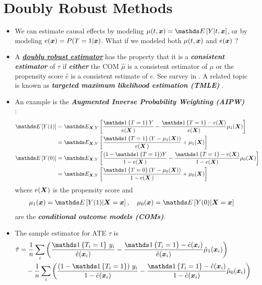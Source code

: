 \documentclass[11pt]{article}
\begin{document}
\section{Doubly Robust Methods}
\begin{itemize}
\item We can estimate causal effects by modeling $\mu(t, \mb{x}) = \E{}{Y |t, \mb{x}}$, or by modeling $e(\boldsymbol{x})  = P(T=1|\boldsymbol{x})$. What if we modeled both $\mu(t, \boldsymbol{x})$ and $e(\boldsymbol{x})$ ? 

\item A \underline{\emph{\textbf{doubly robust estimator}}} has the property that it is a \emph{\textbf{consistent estimator}} of $\tau$ if \emph{\textbf{either}} the COM $\hat{\mu}$ is a consistent estimator of $\mu$ or the propensity score $\hat{e}$ is a consistent estimate of $e$. See survey in \citep{seaman2018introduction}. A related topic is known as \emph{\textbf{targeted maximum likelihood estimation (TMLE)}} \citep{van2006targeted, van2011targeted, schuler2017targeted}.

\item An example is the \emph{\textbf{Augmented Inverse Probability Weighting (AIPW)}} \citep{kurz2022augmented}:
\begin{align}
\E{}{Y(1)} &= \E{\mb{X}, Y}{\frac{\ind{T=1}Y}{e(\mb{X}\,)} - \frac{\ind{T=1} - e(\mb{X})}{e(\mb{X})} \mu_1(\mb{X})}  \label{eqn: aipw_11} \\
&= \E{\mb{X}, Y}{\frac{\ind{T=1}(Y- \mu_1(\mb{X}))}{e(\mb{X}\,)} +  \mu_1(\mb{X})} \label{eqn: aipw_12} \\
\E{}{Y(0)} &= \E{\mb{X}, Y}{\frac{(1-\ind{T=1})Y}{1- e(\mb{X}\,)} - \frac{\ind{T=1} - e(\mb{X})}{1 - e(\mb{X})} \mu_0(\mb{X})}  \label{eqn: aipw_01} \\
&= \E{\mb{X}, Y}{\frac{\ind{T=0}(Y- \mu_0(\mb{X}))}{1 - e(\mb{X}\,)} +  \mu_0(\mb{X})} \label{eqn: aipw_02}
\end{align} where $e(\boldsymbol{X})$ is the propensity score and 
\begin{align*}
 \mu_1(\mb{x}) = \E{}{Y(1) | \mb{X} = \mb{x}}, \quad  \mu_0(\mb{x}) = \E{}{Y(0) | \mb{X} = \mb{x}}
\end{align*} are the \emph{\textbf{conditional outcome models (COMs)}}.

\item 
The sample estimator for ATE $\tau$ is
\begin{align}
\hat{\tau} &= \frac{1}{n}\sum_{i}\paren{\frac{\ind{T_i=1}\,y_i}{\hat{e}(\mb{x}_i)} -  \frac{\ind{T_i=1} - \hat{e}(\mb{x}_i)}{\hat{e}(\mb{x}_i)}\hat{\mu}_1(\mb{x}_i)} \nonumber\\
&\quad -   \frac{1}{n}\sum_{i}\paren{\frac{\paren{1-\ind{T_i=1}}\,y_i}{1-\hat{e}(\mb{x}_i)} -  \frac{\ind{T_i=1} -  \hat{e}(\mb{x}_i)}{1-\hat{e}(\mb{x}_i)}\hat{\mu}_0(\mb{x}_i)}\label{eqn: aipw_sample}
\end{align}


\end{itemize}
\end{document}
